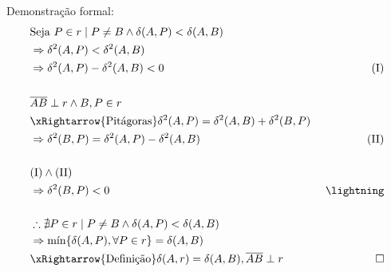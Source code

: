 \documentclass{exam}
\begin{document}
\begin{questions}
\begin{parts}
\begin{subparts}
{        Demonstração formal:
        \begin{equation*}
        \begin{aligned}
          & \text{Seja } P \in r \mid P \ne B \land \delta (A, P) < \delta (A, B)                 &               \\
          & \Rightarrow \delta ^2 (A, P) < \delta ^2 (A, B)                                       &               \\
          & \Rightarrow \delta ^2(A, P) - \delta ^2(A, B) < 0                                     & \ \text{(I)}  \\
          &                                                                                       &               \\
          & \overline{AB} \perp r \land B, P \in r                                                &               \\
          & \xRightarrow{\text{Pitágoras}} \delta ^2 (A, P) = \delta ^2 (A, B) + \delta ^2 (B, P) &               \\
          & \Rightarrow \delta ^2 (B, P) = \delta ^2 (A, P) - \delta ^2 (A, B)                    & \ \text{(II)} \\
          &                                                                                       &               \\
          & \text{(I)} \land \text{(II)}                                                          &               \\      
          & \Rightarrow \delta ^2 (B, P) < 0                                                      & \ \lightning  \\
          &                                                                                       &               \\
          & \therefore \nexists P \in r \mid P \ne B \land \delta (A, P) < \delta (A, B)          &               \\
          & \Rightarrow \text{mín}\{ \delta (A, P), \forall P \in r\} = \delta (A, B)             &               \\
          & \xRightarrow{\text{Definição}} \delta (A, r) = \delta (A, B), \overline{AB} \perp r   & \ \qed        \\      
        \end{aligned}
        \end{equation*}
        
}
\end{subparts}
\end{parts}
\end{questions}
\end{document}
